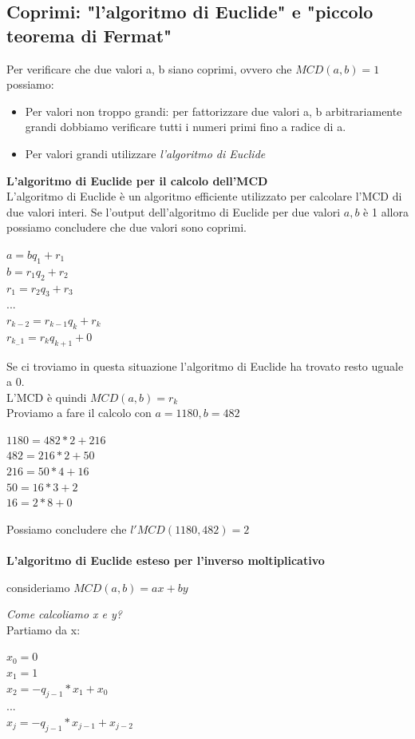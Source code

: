 \documentclass[11pt, oneside]{article}   	%
\begin{document}
\subsection*{Coprimi: "l'algoritmo di Euclide" e "piccolo teorema di Fermat"}
Per verificare che due valori a, b siano coprimi, ovvero che $MCD(a, b)=1$ possiamo:
\begin{itemize}
\item Per valori non troppo grandi: per fattorizzare due valori a, b arbitrariamente grandi dobbiamo verificare tutti i numeri primi fino a radice di a. 
\item Per valori grandi utilizzare \emph{l'algoritmo di Euclide}
\end{itemize}
\textbf{L'algoritmo di Euclide per il calcolo dell'MCD}\\
L'algoritmo di Euclide è un algoritmo efficiente utilizzato per calcolare l'MCD di due valori interi. Se l'output dell'algoritmo di Euclide per due valori $a,b$ è 1 allora possiamo concludere che due valori sono coprimi.
\begin{center}
$a = bq_1 + r_1$\\
$b = r_1 q_2 + r_2$\\
$r_1 = r_2q_3 + r_3$\\
...\\
$r_{k-2} = r_{k-1}q_k+r_k$\\
$r_{k_-1} = r_kq_{k+1} + 0$\\
\end{center}
Se ci troviamo in questa situazione l'algoritmo di Euclide ha trovato resto uguale a 0.\\
L'MCD è quindi $MCD(a,b) = r_k$\\
Proviamo a fare il calcolo con $a = 1180, b= 482$
\begin{center}
$1180 = 482*  2 +216$\\
$482 = 216*2+50$\\
$216 =50*4+16$\\
$50=16*3+2$\\
$16=2*8+0$
\end{center}
Possiamo concludere che $l'MCD(1180, 482) = 2$\\\\
\textbf{L'algoritmo di Euclide esteso per l'inverso moltiplicativo}
\begin{center}
consideriamo $MCD(a,b) = ax+by$\\
\end{center}
\emph{Come calcoliamo x e y?}\\
Partiamo da x:\begin{center}
$x_0 = 0$\\
$x_1 = 1$\\
$x_2 = -q_{j-1} * x_1+x_0$\\
...\\
$x_j = -q_{j-1} * x_{j-1} + x_{j-2}$
\end{center}
\end{document}
